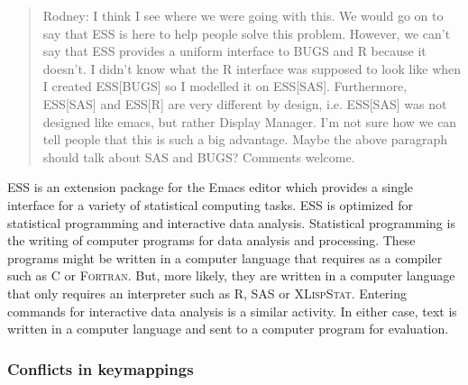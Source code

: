 \documentclass{article}
\newcommand*{\SAS}{\textsc{SAS}{\textregistered} }
\newcommand*{\XLispStat}{\textsc{XLispStat}}
\newcommand*{\Fortran}{\textsc{Fortran}}
\begin{document}
\begin{quote}
 Rodney:  I think I see where we were going with this.  We would go on to
say that ESS is here to help people solve this problem.  However,
we can't say that ESS provides a uniform interface to BUGS and R because
it doesn't.  I didn't know what the R interface was supposed to look like
when I created ESS[BUGS] so I modelled it on ESS[SAS].  Furthermore,
ESS[SAS] and ESS[R] are very different by design, i.e. ESS[SAS] was not
designed like emacs, but rather Display Manager.  I'm not sure how we can tell
people that this is such a big advantage.  Maybe the above paragraph
should talk about SAS and BUGS?  Comments welcome.
\end{quote}

ESS is an extension package for
the Emacs editor which provides a single interface for a variety of
statistical computing tasks.  ESS is optimized for statistical programming
and interactive data analysis.  Statistical programming is the writing of
computer programs for data analysis and processing.  These programs might be
written in a computer language that requires as a compiler such as C or
\Fortran.  But, more likely, they are written in a  computer
language that only requires an interpreter such as R, \SAS or \XLispStat.
Entering commands for interactive data analysis is a similar activity.
In either case, text is written in a computer language and sent to a
computer program for evaluation.

\subsubsection{Conflicts in keymappings}
\label{sec:confl-keym}
\end{document}
